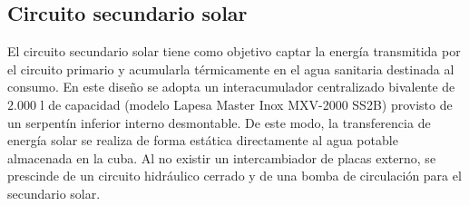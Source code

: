 \documentclass[12pt]{article}
\begin{document}
\subsection{Circuito secundario solar}
\label{subsec:circuito_secundario_solar}

El circuito secundario solar tiene como objetivo captar la energía transmitida por el circuito primario y acumularla térmicamente en el agua sanitaria destinada al consumo. En este diseño se adopta un interacumulador centralizado bivalente de $2.000\text{ l}$ de capacidad (modelo Lapesa Master Inox MXV-2000 SS2B) provisto de un serpentín inferior interno desmontable. De este modo, la transferencia de energía solar se realiza de forma estática directamente al agua potable almacenada en la cuba. Al no existir un intercambiador de placas externo, se prescinde de un circuito hidráulico cerrado y de una bomba de circulación para el secundario solar.
\end{document}
